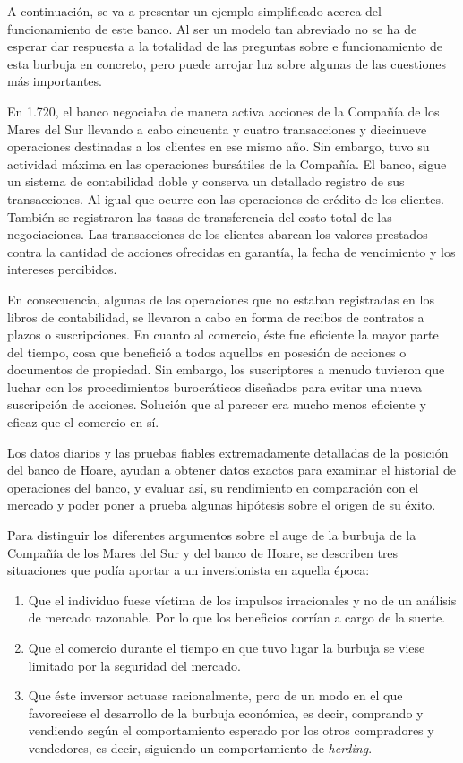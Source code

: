 A continuación, se va a presentar un ejemplo simplificado acerca del funcionamiento de este banco. Al ser un modelo tan abreviado no se ha de esperar dar respuesta a la totalidad de las preguntas sobre e funcionamiento de esta burbuja en concreto, pero puede arrojar luz sobre algunas de las cuestiones más importantes.

En 1.720, el banco negociaba de manera activa acciones de la Compañía de los Mares del Sur llevando a cabo cincuenta y cuatro transacciones y diecinueve operaciones destinadas a los clientes en ese mismo año. Sin embargo, tuvo su actividad máxima en las operaciones bursátiles de la Compañía. El banco, sigue un sistema de contabilidad doble y conserva un detallado registro de sus transacciones. Al igual que ocurre con las operaciones de crédito de los clientes. También se registraron las tasas de transferencia del costo total de las negociaciones. Las transacciones de los clientes abarcan los valores prestados contra la cantidad de acciones ofrecidas en garantía, la fecha de vencimiento y los intereses percibidos. 

En consecuencia, algunas de las operaciones que no estaban registradas en los libros de contabilidad, se llevaron a cabo en forma de recibos de contratos a plazos o suscripciones. En cuanto al comercio, éste fue eficiente la mayor parte del tiempo, cosa que benefició a todos aquellos en posesión de acciones o documentos de propiedad. Sin embargo, los suscriptores a menudo tuvieron que luchar con los procedimientos burocráticos diseñados para evitar una nueva suscripción de acciones. Solución que al parecer era mucho menos eficiente y eficaz que el comercio en sí. 

Los datos diarios y las pruebas fiables extremadamente detalladas de la posición del banco de Hoare, ayudan a obtener datos exactos para examinar el historial de operaciones del banco, y evaluar así, su rendimiento en comparación con el mercado y poder poner a prueba algunas hipótesis sobre el origen de su éxito. 

Para distinguir los diferentes argumentos sobre el auge de la burbuja de la Compañía de los Mares del Sur y del banco de Hoare, se describen tres situaciones que podía aportar a un inversionista en aquella época:

 \begin{enumerate}
\item Que el individuo fuese víctima de los impulsos irracionales y no de un análisis de mercado razonable. Por lo que los beneficios corrían a cargo de la suerte.
\item Que el comercio durante el tiempo en que tuvo lugar la burbuja se viese limitado por la seguridad del mercado. 
\item Que éste inversor actuase racionalmente, pero de un modo en el que favoreciese el desarrollo de la burbuja económica, es decir, comprando y vendiendo según el comportamiento esperado por los otros compradores y vendedores, es decir, siguiendo un comportamiento de \emph{herding}.
 \end{enumerate}


